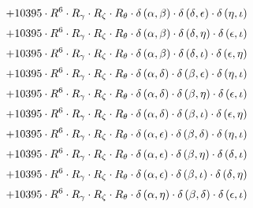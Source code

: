 \begin{subequations}
\begin{gather}
 \\[0.2em] \notag 		 + 10395 \cdot R^{6} \cdot R_{\gamma{}} \cdot R_{\zeta{}} \cdot R_{\theta{}} \cdot \delta{}\left(\alpha{}, \beta{}\right) \cdot \delta{}\left(\delta{}, \epsilon{}\right) \cdot \delta{}\left(\eta{}, \iota{}\right) 
 \\[0.2em] \notag 		 + 10395 \cdot R^{6} \cdot R_{\gamma{}} \cdot R_{\zeta{}} \cdot R_{\theta{}} \cdot \delta{}\left(\alpha{}, \beta{}\right) \cdot \delta{}\left(\delta{}, \eta{}\right) \cdot \delta{}\left(\epsilon{}, \iota{}\right) 
 \\[0.2em] \notag 		 + 10395 \cdot R^{6} \cdot R_{\gamma{}} \cdot R_{\zeta{}} \cdot R_{\theta{}} \cdot \delta{}\left(\alpha{}, \beta{}\right) \cdot \delta{}\left(\delta{}, \iota{}\right) \cdot \delta{}\left(\epsilon{}, \eta{}\right) 
 \\[0.2em] \notag 		 + 10395 \cdot R^{6} \cdot R_{\gamma{}} \cdot R_{\zeta{}} \cdot R_{\theta{}} \cdot \delta{}\left(\alpha{}, \delta{}\right) \cdot \delta{}\left(\beta{}, \epsilon{}\right) \cdot \delta{}\left(\eta{}, \iota{}\right) 
 \\[0.2em] \notag 		 + 10395 \cdot R^{6} \cdot R_{\gamma{}} \cdot R_{\zeta{}} \cdot R_{\theta{}} \cdot \delta{}\left(\alpha{}, \delta{}\right) \cdot \delta{}\left(\beta{}, \eta{}\right) \cdot \delta{}\left(\epsilon{}, \iota{}\right) 
 \\[0.2em] \notag 		 + 10395 \cdot R^{6} \cdot R_{\gamma{}} \cdot R_{\zeta{}} \cdot R_{\theta{}} \cdot \delta{}\left(\alpha{}, \delta{}\right) \cdot \delta{}\left(\beta{}, \iota{}\right) \cdot \delta{}\left(\epsilon{}, \eta{}\right) 
 \\[0.2em] \notag 		 + 10395 \cdot R^{6} \cdot R_{\gamma{}} \cdot R_{\zeta{}} \cdot R_{\theta{}} \cdot \delta{}\left(\alpha{}, \epsilon{}\right) \cdot \delta{}\left(\beta{}, \delta{}\right) \cdot \delta{}\left(\eta{}, \iota{}\right) 
 \\[0.2em] \notag 		 + 10395 \cdot R^{6} \cdot R_{\gamma{}} \cdot R_{\zeta{}} \cdot R_{\theta{}} \cdot \delta{}\left(\alpha{}, \epsilon{}\right) \cdot \delta{}\left(\beta{}, \eta{}\right) \cdot \delta{}\left(\delta{}, \iota{}\right) 
 \\[0.2em] \notag 		 + 10395 \cdot R^{6} \cdot R_{\gamma{}} \cdot R_{\zeta{}} \cdot R_{\theta{}} \cdot \delta{}\left(\alpha{}, \epsilon{}\right) \cdot \delta{}\left(\beta{}, \iota{}\right) \cdot \delta{}\left(\delta{}, \eta{}\right) 
 \\[0.2em] \notag 		 + 10395 \cdot R^{6} \cdot R_{\gamma{}} \cdot R_{\zeta{}} \cdot R_{\theta{}} \cdot \delta{}\left(\alpha{}, \eta{}\right) \cdot \delta{}\left(\beta{}, \delta{}\right) \cdot \delta{}\left(\epsilon{}, \iota{}\right) 

\end{gather}
\end{subequations}
